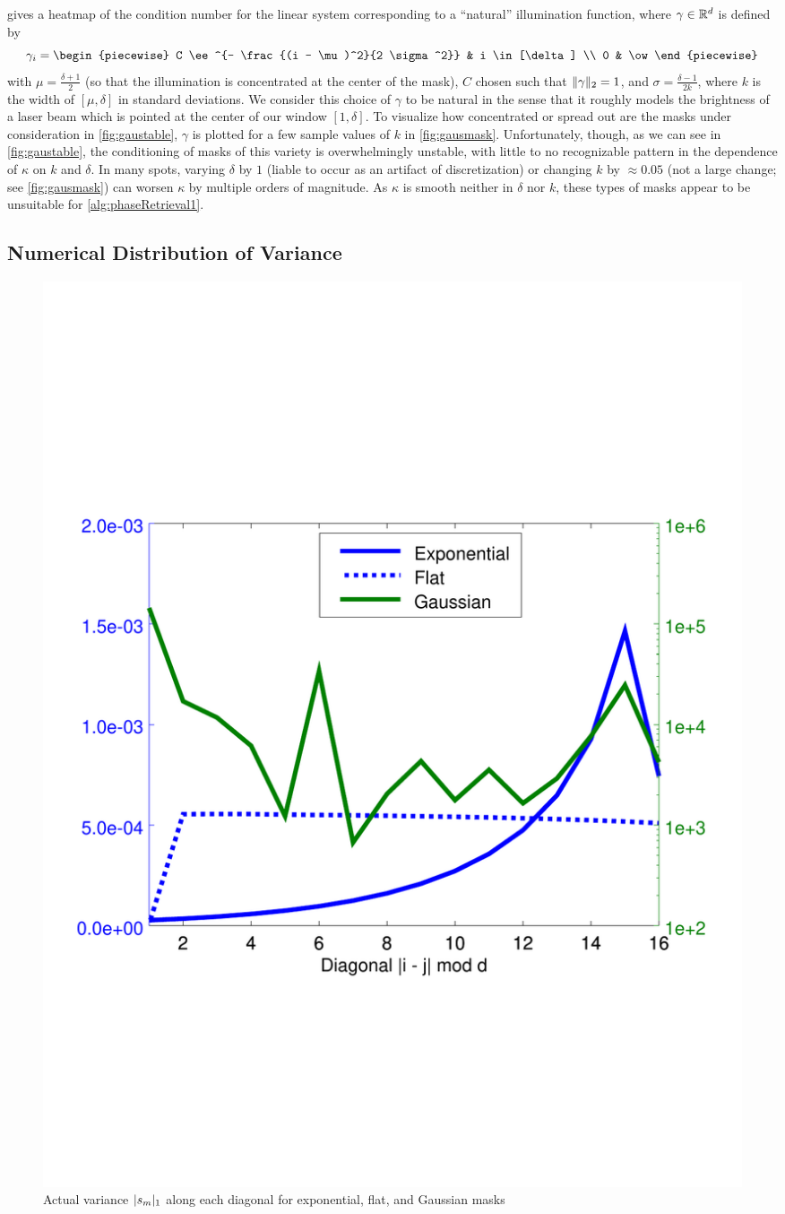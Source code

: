  gives a heatmap of the condition number for the linear system corresponding to a ``natural'' illumination function, where $\gamma \in \mathbb{R}^d$ is defined by \[\gamma_i = \begin{piecewise} C \ee^{- \frac{(i - \mu)^2}{2 \sigma^2}} & i \in [\delta] \\ 0 & \ow \end{piecewise}\] with $\mu = \frac{\delta + 1}{2}$ (so that the illumination is concentrated at the center of the mask), $C$ chosen such that $\lVert\gamma\rVert_2 = 1$, and $\sigma = \frac{\delta - 1}{2 k}$, where $k$ is the width of $[\mu, \delta]$ in standard deviations.  We consider this choice of $\gamma$ to be natural in the sense that it roughly models the brightness of a laser beam which is pointed at the center of our window $[1, \delta]$.  To visualize how concentrated or spread out are the masks under consideration in \cref{fig:gaustable}, $\gamma$ is plotted for a few sample values of $k$ in \cref{fig:gausmask}.  Unfortunately, though, as we can see in \cref{fig:gaustable}, the conditioning of masks of this variety is overwhelmingly unstable, with little to no recognizable pattern in the dependence of $\kappa$ on $k$ and $\delta$.  In many spots, varying $\delta$ by $1$ (liable to occur as an artifact of discretization) or changing $k$ by $\approx 0.05$ (not a large change; see \cref{fig:gausmask}) can worsen $\kappa$ by multiple orders of magnitude.  As $\kappa$ is smooth neither in $\delta$ nor $k$, these types of masks appear to be unsuitable for \cref{alg:phaseRetrieval1}.

\subsection{Numerical Distribution of Variance}
\label{sec:distvar_num}

\begin{figure}
  \centering
    \includegraphics[width=.7\textwidth,trim={.4in 2.5in .8in 2.5in}]{figs/realvar}
  \caption{Actual variance $\lvert s_m\rvert_1$ along each diagonal for exponential, flat, and Gaussian masks}
  \label{fig:realvar}
\end{figure}

